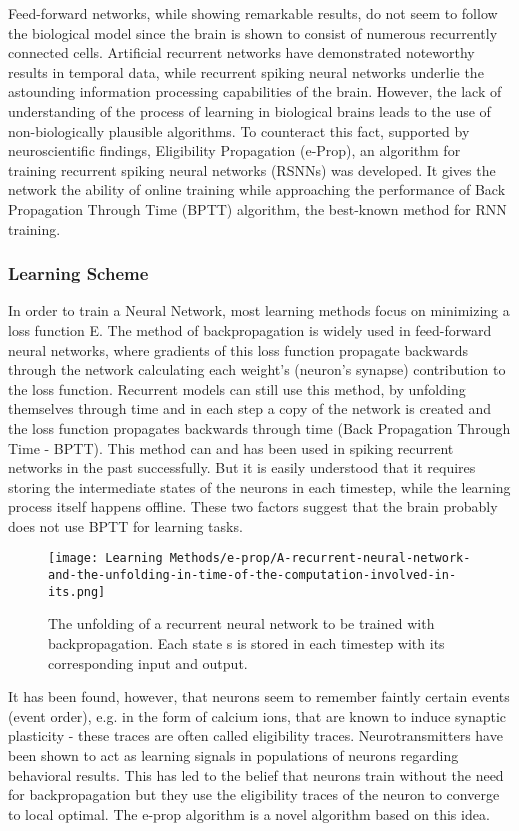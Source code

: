 \documentclass[12pt]{report}
\begin{document}
Feed-forward networks, while showing remarkable results, do not seem to follow the biological model since the brain is shown to consist of numerous recurrently connected cells. Artificial recurrent networks have demonstrated noteworthy results in temporal data, while recurrent spiking neural networks underlie the astounding information processing capabilities of the brain. However, the lack of understanding of the process of learning in biological brains leads to the use of non-biologically plausible algorithms. To counteract this fact, supported by neuroscientific findings, Eligibility Propagation (e-Prop)\cite{Bellec2020}, an algorithm for training recurrent spiking neural networks (RSNNs) was developed. It gives the network the ability of online training while approaching the performance of Back Propagation Through Time (BPTT) algorithm, the best-known method for RNN training.
 
\subsubsection{Learning Scheme}
In order to train a Neural Network, most learning methods focus on minimizing a loss function E. The method of backpropagation is widely used in feed-forward neural networks, where gradients of this loss function propagate backwards through the network calculating each weight's (neuron's synapse) contribution to the loss function. Recurrent models can still use this method, by unfolding themselves through time and in each step a copy of the network is created and the loss function propagates backwards through time (Back Propagation Through Time - BPTT). This method can and has been used in spiking recurrent networks in the past successfully. But it is easily understood that it requires storing the intermediate states of the neurons in each timestep, while the learning process itself happens offline. These two factors suggest that the brain probably does not use BPTT for learning tasks.

\begin{figure}[htp]
    \centering
    \texttt{[image: Learning Methods/e-prop/A-recurrent-neural-network-and-the-unfolding-in-time-of-the-computation-involved-in-its.png]}
    \caption{The unfolding of a recurrent neural network to be trained with backpropagation. Each state s is stored in each timestep with its corresponding input and output. 
    \label{fig:readout}}
\end{figure}

It has been found, however, that neurons seem to remember faintly certain events (event order), e.g. in the form of calcium ions, that are known to induce synaptic plasticity - these traces are often called eligibility traces. Neurotransmitters have been shown to act as learning signals in populations of neurons regarding behavioral results. This has led to the belief that neurons train without the need for backpropagation but they use the eligibility traces of the neuron to converge to local optimal. The e-prop algorithm is a novel algorithm based on this idea.
\end{document}
